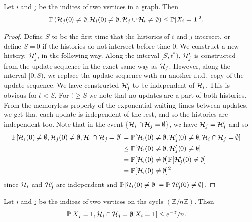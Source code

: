 	\begin{lemma}
	\label{lem:prob Xj Xi and no intersect}
		Let $i$ and $j$ be the indices of two vertices in a graph. Then
		\begin{equation}
			\mathbb{P}\left(\mathcal{H}_j(0) \neq \emptyset, \mathcal{H}_i(0) \neq \emptyset, \mathcal{H}_j \cup \mathcal{H}_i \neq \emptyset \right) \leq \mathbb{P}[X_i = 1]^2.
		\end{equation}
	\end{lemma}
	\begin{proof}
		Define $S$ to be the first time that the histories of $i$ and $j$ intersect, or define $S = 0$ if the histories do not intersect before time $0$. We construct a new history, $\mathcal{H}_j'$, in the following way. Along the interval $[S, t^*)$, $\mathcal{H}_j'$ is constructed from the update sequence in the exact same way as $\mathcal{H}_j$. However, along the interval $[0, S)$, we replace the update sequence with an another i.i.d.\ copy of the update sequence. We have constructed $\mathcal{H}_j'$ to be independent of $\mathcal{H}_i$. This is obvious for $t < S$. For $t \geq S$ we note that no updates are a part of both histories. From the memoryless property of the exponential waiting times between updates, we get that each update is independent of the rest, and so the histories are independent too. Note that in the event $\{\mathcal{H}_i \cap \mathcal{H}_j = \emptyset\}$, we have $\mathcal{H}_j = \mathcal{H}_j'$ and so
		\begin{align}
			\mathbb{P}[\mathcal{H}_i(0) \neq \emptyset, \mathcal{H}_j(0) \neq \emptyset, \mathcal{H}_i \cap \mathcal{H}_j = \emptyset] &= \mathbb{P}[\mathcal{H}_i(0) \neq \emptyset, \mathcal{H}_j'(0) \neq \emptyset, \mathcal{H}_i \cap \mathcal{H}_j = \emptyset]\\
			&\leq \mathbb{P}[\mathcal{H}_i(0) \neq \emptyset, \mathcal{H}_j'(0) \neq \emptyset]\\
			&= \mathbb{P}[\mathcal{H}_i(0) \neq \emptyset] \mathbb{P}[\mathcal{H}_j'(0) \neq \emptyset]\\
			&= \mathbb{P}[\mathcal{H}_i(0) \neq \emptyset]^2
		\end{align}
		since $\mathcal{H}_i$ and $\mathcal{H}_j'$ are independent and $\mathbb{P}[\mathcal{H}_i(0) \neq \emptyset] = \mathbb{P}[\mathcal{H}_j'(0) \neq \emptyset]$.
	\end{proof}
	\begin{lemma}
		\label{lem:prob Xj and no intersect given Xi}
		Let $i$ and $j$ be the indices of two vertices on the cycle $(\mathbb{Z}/n\mathbb{Z})$. Then
		\begin{equation}
			\mathbb{P}[X_j = 1, \mathcal{H}_i \cap\mathcal{H}_j = \emptyset|X_i = 1] \leq e^{-z}/n.
		\end{equation}
	\end{lemma}
